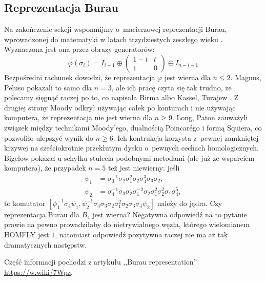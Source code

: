 
\subsection{Reprezentacja Burau}
Na zakończenie sekcji wspomnijmy o~macierzowej reprezentacji Burau, wprowadzonej do matematyki w latach trzydziestych zeszłego wieku \cite{burau33}.
%
%
Wyznaczona jest ona przez obrazy generatorów:
\begin{equation}
    \varphi(\sigma_i) = I_{i-1} \oplus \begin{pmatrix}
        1-t & t \\
        1   & 0
    \end{pmatrix} \oplus I_{n-i-1}
\end{equation}
Bezpośredni rachunek dowodzi, że reprezentacja $\varphi$ jest wierna dla $n \le 2$.
Magnus, Peluso \cite{peluso69} pokazali to samo dla $n = 3$, ale ich pracę czyta się tak trudno, że polecamy sięgnąć raczej po to, co napisała Birma \cite[s. 129]{birman74} albo Kassel, Turajew \cite[s. 110]{kassel08}.
Z drugiej strony Moody \cite{moody91} odkrył używając całek po konturach i nie używając komputera, że reprezentacja nie jest wierna dla $n \ge 9$.
%
Long, Paton \cite{paton93} zauważyli związek między technikami Moody'ego, dualnością Poincarégo i formą Squiera, co pozwoliło ulepszyć wynik do $n \ge 6$.
%
%
Ich kontrukcja korzysta z~pewnej zamkniętej krzywej na sześciokrotnie przekłutym dysku o~pewnych cechach homologicznych.
Bigelow \cite{bigelow99} pokazał u schyłku stulecia podobnymi metodami (ale już ze wsparciem komputera), że przypadek $n = 5$ też jest niewierny: jeśli
%
\begin{align}
    \psi_1 & = \sigma_3^{{-1}}\sigma_2\sigma_1^2\sigma_2\sigma_4^3\sigma_3\sigma_2, \\
\psi_2 & = \sigma_4^{{-1}}\sigma_3\sigma_2\sigma_1^{{-2}}\sigma_2\sigma_1^2\sigma_2^2\sigma_1\sigma_4^5,
\end{align}
to komutator $[\psi_1^{{-1}}\sigma_4\psi_1,\psi_2^{{-1}}\sigma_4\sigma_3\sigma_2\sigma_1^2\sigma_2\sigma_3\sigma_4\psi_2]$ należy do jądra.
Czy reprezentacja Burau dla $B_4$ jest wierna?
Negatywna odpowiedź na to pytanie prawie na pewno prowadziłaby do
nietrywialnego węzła, którego wielomianem HOMFLY jest $1$,
natomiast odpowiedź pozytywna raczej nie ma aż tak dramatycznych następstw.

Część informacji pochodzi z artykułu ,,Burau representation'' \url{https://w.wiki/7Wpz}.

